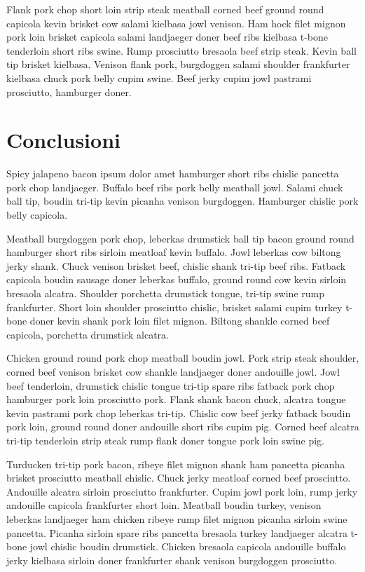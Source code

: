 \documentclass[a4paper]{article}
\begin{document}
Flank pork chop short loin strip steak meatball corned beef ground round capicola kevin brisket cow salami kielbasa jowl venison. Ham hock filet mignon pork loin brisket capicola salami landjaeger doner beef ribs kielbasa t-bone tenderloin short ribs swine. Rump prosciutto bresaola beef strip steak. Kevin ball tip brisket kielbasa. Venison flank pork, burgdoggen salami shoulder frankfurter kielbasa chuck pork belly cupim swine. Beef jerky cupim jowl pastrami prosciutto, hamburger doner.

\section{Conclusioni}

Spicy jalapeno bacon ipsum dolor amet hamburger short ribs chislic pancetta pork chop landjaeger. Buffalo beef ribs pork belly meatball jowl. Salami chuck ball tip, boudin tri-tip kevin picanha venison burgdoggen. Hamburger chislic pork belly capicola.

Meatball burgdoggen pork chop, leberkas drumstick ball tip bacon ground round hamburger short ribs sirloin meatloaf kevin buffalo. Jowl leberkas cow biltong jerky shank. Chuck venison brisket beef, chislic shank tri-tip beef ribs. Fatback capicola boudin sausage doner leberkas buffalo, ground round cow kevin sirloin bresaola alcatra. Shoulder porchetta drumstick tongue, tri-tip swine rump frankfurter. Short loin shoulder prosciutto chislic, brisket salami cupim turkey t-bone doner kevin shank pork loin filet mignon. Biltong shankle corned beef capicola, porchetta drumstick alcatra.

Chicken ground round pork chop meatball boudin jowl. Pork strip steak shoulder, corned beef venison brisket cow shankle landjaeger doner andouille jowl. Jowl beef tenderloin, drumstick chislic tongue tri-tip spare ribs fatback pork chop hamburger pork loin prosciutto pork. Flank shank bacon chuck, alcatra tongue kevin pastrami pork chop leberkas tri-tip. Chislic cow beef jerky fatback boudin pork loin, ground round doner andouille short ribs cupim pig. Corned beef alcatra tri-tip tenderloin strip steak rump flank doner tongue pork loin swine pig.

Turducken tri-tip pork bacon, ribeye filet mignon shank ham pancetta picanha brisket prosciutto meatball chislic. Chuck jerky meatloaf corned beef prosciutto. Andouille alcatra sirloin prosciutto frankfurter. Cupim jowl pork loin, rump jerky andouille capicola frankfurter short loin. Meatball boudin turkey, venison leberkas landjaeger ham chicken ribeye rump filet mignon picanha sirloin swine pancetta. Picanha sirloin spare ribs pancetta bresaola turkey landjaeger alcatra t-bone jowl chislic boudin drumstick. Chicken bresaola capicola andouille buffalo jerky kielbasa sirloin doner frankfurter shank venison burgdoggen prosciutto.
\end{document}
